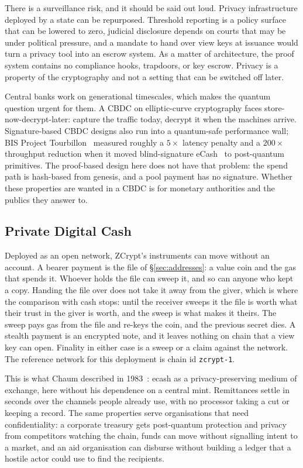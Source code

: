 \documentclass[twocolumn,10pt]{article}
\begin{document}
There is a surveillance risk, and it should be said out loud. Privacy infrastructure deployed by a state can be repurposed. Threshold reporting is a policy surface that can be lowered to zero, judicial disclosure depends on courts that may be under political pressure, and a mandate to hand over view keys at issuance would turn a privacy tool into an escrow system. As a matter of architecture, the proof system contains no compliance hooks, trapdoors, or key escrow. Privacy is a property of the cryptography and not a setting that can be switched off later.

Central banks work on generational timescales, which makes the quantum question urgent for them. A CBDC on elliptic-curve cryptography faces store-now-decrypt-later: capture the traffic today, decrypt it when the machines arrive. Signature-based CBDC designs also run into a quantum-safe performance wall; BIS Project Tourbillon~\cite{tourbillon} measured roughly a $5\times$ latency penalty and a $200\times$ throughput reduction when it moved blind-signature eCash~\cite{ecash2} to post-quantum primitives. The proof-based design here does not have that problem: the spend path is hash-based from genesis, and a pool payment has no signature. Whether these properties are wanted in a CBDC is for monetary authorities and the publics they answer to.

\subsection{Private Digital Cash}

Deployed as an open network, ZCrypt's instruments can move without an account. A bearer payment is the file of \S\ref{sec:addresses}: a value coin and the gas that spends it. Whoever holds the file can sweep it, and so can anyone who kept a copy. Handing the file over does not take it away from the giver, which is where the comparison with cash stops: until the receiver sweeps it the file is worth what their trust in the giver is worth, and the sweep is what makes it theirs. The sweep pays gas from the file and re-keys the coin, and the previous secret dies. A stealth payment is an encrypted note, and it leaves nothing on chain that a view key can open. Finality in either case is a sweep or a claim against the network. The reference network for this deployment is chain id \texttt{zcrypt-1}.

This is what Chaum described in 1983~\cite{chaum1983,chaum1990}: ecash as a privacy-preserving medium of exchange, here without his dependence on a central mint. Remittances settle in seconds over the channels people already use, with no processor taking a cut or keeping a record. The same properties serve organisations that need confidentiality: a corporate treasury gets post-quantum protection and privacy from competitors watching the chain, funds can move without signalling intent to a market, and an aid organisation can disburse without building a ledger that a hostile actor could use to find the recipients.
\end{document}
